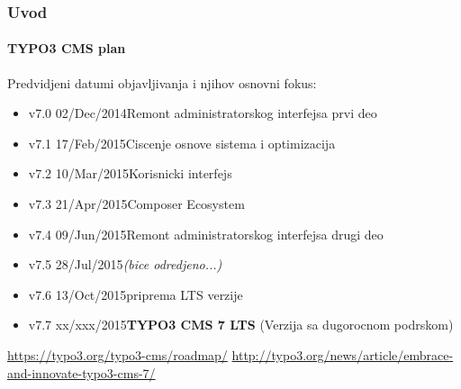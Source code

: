 
\begin{frame}[fragile]
	\frametitle{Uvod}
	\framesubtitle{TYPO3 CMS plan}

	Predvidjeni datumi objavljivanja i njihov osnovni fokus:

	\begin{itemize}
		\item
			\begingroup
				\color{typo3orange}
					v7.0 \textrightarrow\tabto{1.3cm}02/Dec/2014\tabto{3.4cm}Remont administratorskog interfejsa prvi deo
			\endgroup

		\item v7.1 \textrightarrow\tabto{1.3cm}17/Feb/2015\tabto{3.4cm}Ciscenje osnove sistema i optimizacija
		\item v7.2 \textrightarrow\tabto{1.3cm}10/Mar/2015\tabto{3.4cm}Korisnicki interfejs
		\item v7.3 \textrightarrow\tabto{1.3cm}21/Apr/2015\tabto{3.4cm}Composer Ecosystem
		\item v7.4 \textrightarrow\tabto{1.3cm}09/Jun/2015\tabto{3.4cm}Remont administratorskog interfejsa drugi deo
		\item v7.5 \textrightarrow\tabto{1.3cm}28/Jul/2015\tabto{3.4cm}\textit{(bice odredjeno...)}
		\item v7.6 \textrightarrow\tabto{1.3cm}13/Oct/2015\tabto{3.4cm}priprema LTS verzije
		\item v7.7 \textrightarrow\tabto{1.3cm}xx/xxx/2015\tabto{3.4cm}\textbf{TYPO3 CMS 7 LTS} (Verzija sa dugorocnom podrskom)
	\end{itemize}

	\smaller
		\url{https://typo3.org/typo3-cms/roadmap/}\newline
		\url{http://typo3.org/news/article/embrace-and-innovate-typo3-cms-7/}
	\normalsize

\end{frame}


